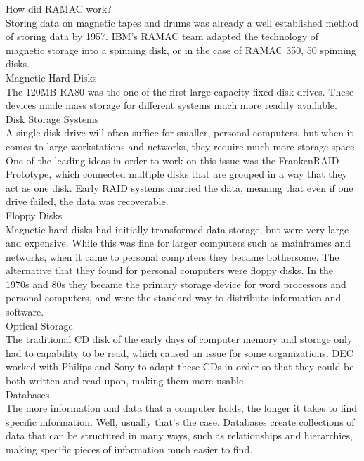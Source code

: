 \documentclass[letterpaper, 10 pt, conference]{IEEEconf}
\begin{document}
How did RAMAC work?\\
Storing data on magnetic tapes and drums was already a well established method of storing data by 1957. IBM's RAMAC team adapted the technology of magnetic storage into a spinning disk, or in the case of RAMAC 350, 50 spinning disks.\\

Magnetic Hard Disks\\
The 120MB RA80 was the one of the first large capacity fixed disk drives. These devices made mass storage for different systems much more readily available.\\

Disk Storage Systems\\
A single disk drive will often suffice for smaller, personal computers, but when it comes to large workstations and networks, they require much more storage space. One of the leading ideas in order to work on this issue was the FrankenRAID Prototype, which connected multiple disks that are grouped in a way that they act as one disk. Early RAID systems married the data, meaning that even if one drive failed, the data was recoverable.\\

Floppy Disks\\
Magnetic hard disks had initially transformed data storage, but were very large and expensive. While this was fine for larger computers such as mainframes and networks, when it came to personal computers they became bothersome. The alternative that they found for personal computers were floppy disks. In the 1970s and 80s they became the primary storage device for word processors and personal computers, and were the standard way to distribute information and software.\\

Optical Storage\\
The traditional CD disk of the early days of computer memory and storage only had to capability to be read, which caused an issue for some organizations. DEC worked with Philips and Sony to adapt these CDs in order so that they could be both written and read upon, making them more usable.\\

Databases\\
The more information and data that a computer holds, the longer it takes to find specific information. Well, usually that's the case. Databases create collections of data that can be structured in many ways, such as relationships and hierarchies, making specific pieces of information much easier to find.
\end{document}
